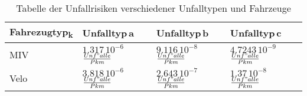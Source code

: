 %
%
%
%

\begin{table}[hbt!]
\flushleft
%
%
\begin{tabular}{@{}p{2.5cm} p{3.2cm} p{3.2cm} p{3.2cm}@{}} \\   
\toprule
\textbf{Fahrezugtyp\textsubscript{k}} & \textbf{Unfalltyp\,a} & \textbf{Unfalltyp\,b} & \textbf{Unfalltyp\,c} \\
\midrule
MIV      & \(1.317\,\mathrm{10^{-6}}\) $\frac{Unf"alle}{Pkm}$ & \(9.116\,\mathrm{10^{-8}}\) $\frac{Unf"alle}{Pkm}$ & \(4.7243\,\mathrm{10^{-9}}\) $\frac{Unf"alle}{Pkm}$ \\
Velo	 & \(3.818\,\mathrm{10^{-6}}\)  $\frac{Unf"alle}{Pkm}$ & \(2.643\,\mathrm{10^{-7}}\)  $\frac{Unf"alle}{Pkm}$ & \(1.37\,\mathrm{10^{-8}}\)  $\frac{Unf"alle}{Pkm}$  \\

\bottomrule

\end{tabular}
\caption{Tabelle der Unfallrisiken verschiedener Unfalltypen und Fahrzeuge}
\label{tab:t-06-01-Unfallrisiko}
\end{table}


%


